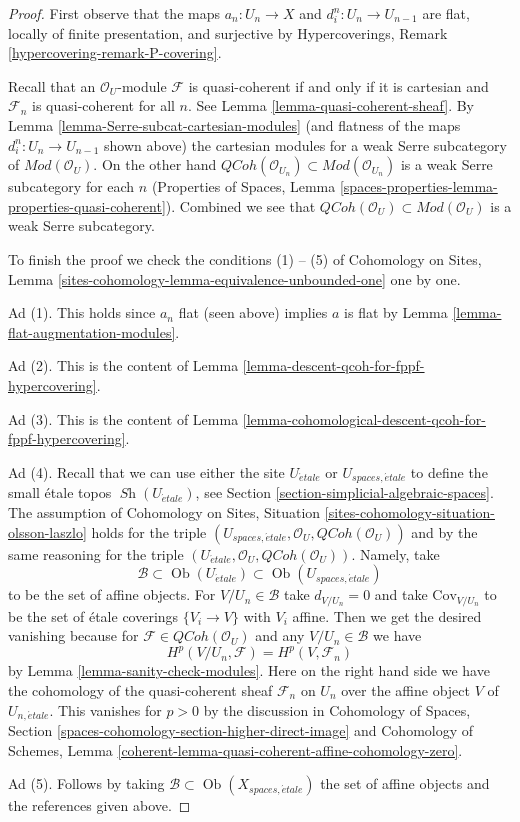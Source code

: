 \documentclass{stacks-project}
\theoremstyle{plain}
\theoremstyle{definition}
\theoremstyle{remark}
\numberwithin{equation}{subsection}
\def\Ob{\mathop{\mathrm{Ob}}\nolimits}
\def\Sh{\mathop{\mathit{Sh}}\nolimits}
\def\etale{{\acute{e}tale}}
\def\QCoh{\mathit{QCoh}}
\begin{document}
\begin{proof}
First observe that the maps $a_n : U_n \to X$ and $d^n_i : U_n \to U_{n - 1}$
are flat, locally of finite presentation, and surjective by
Hypercoverings, Remark \ref{hypercovering-remark-P-covering}.

\medskip\noindent
Recall that an $\mathcal{O}_U$-module $\mathcal{F}$ is quasi-coherent if and
only if it is cartesian and $\mathcal{F}_n$ is quasi-coherent for all $n$.
See Lemma \ref{lemma-quasi-coherent-sheaf}.
By Lemma \ref{lemma-Serre-subcat-cartesian-modules}
(and flatness of the maps $d^n_i : U_n \to U_{n - 1}$ shown above)
the cartesian modules for a weak Serre subcategory of
$\textit{Mod}(\mathcal{O}_U)$. On the other hand
$\QCoh(\mathcal{O}_{U_n}) \subset \textit{Mod}(\mathcal{O}_{U_n})$
is a weak Serre subcategory for each $n$
(Properties of Spaces, Lemma
\ref{spaces-properties-lemma-properties-quasi-coherent}).
Combined we see that
$\QCoh(\mathcal{O}_U) \subset \textit{Mod}(\mathcal{O}_U)$
is a weak Serre subcategory.

\medskip\noindent
To finish the proof we check the conditions (1) -- (5) of
Cohomology on Sites, Lemma
\ref{sites-cohomology-lemma-equivalence-unbounded-one} one by one.

\medskip\noindent
Ad (1). This holds since $a_n$ flat (seen above) implies $a$ is flat
by Lemma \ref{lemma-flat-augmentation-modules}.

\medskip\noindent
Ad (2). This is the content of
Lemma \ref{lemma-descent-qcoh-for-fppf-hypercovering}.

\medskip\noindent
Ad (3). This is the content of
Lemma \ref{lemma-cohomological-descent-qcoh-for-fppf-hypercovering}.

\medskip\noindent
Ad (4). Recall that we can use either the site $U_\etale$ or
$U_{spaces, \etale}$ to define the small \'etale topos
$\Sh(U_\etale)$, see Section \ref{section-simplicial-algebraic-spaces}.
The assumption of
Cohomology on Sites, Situation \ref{sites-cohomology-situation-olsson-laszlo}
holds for the triple
$(U_{spaces, \etale}, \mathcal{O}_U, \QCoh(\mathcal{O}_U))$
and by the same reasoning for the triple
$(U_\etale, \mathcal{O}_U, \QCoh(\mathcal{O}_U))$.
Namely, take
$$
\mathcal{B} \subset \Ob(U_\etale) \subset \Ob(U_{spaces, \etale})
$$
to be the set of affine objects. For $V/U_n \in \mathcal{B}$
take $d_{V/U_n} = 0$ and take $\text{Cov}_{V/U_n}$ to be the set of
\'etale coverings $\{V_i \to V\}$ with $V_i$ affine.
Then we get the desired vanishing because for
$\mathcal{F} \in \QCoh(\mathcal{O}_U)$
and any $V/U_n \in \mathcal{B}$ we have
$$
H^p(V/U_n, \mathcal{F}) = H^p(V, \mathcal{F}_n)
$$
by Lemma \ref{lemma-sanity-check-modules}. Here on the
right hand side we have the cohomology of the quasi-coherent
sheaf $\mathcal{F}_n$ on $U_n$ over the affine object $V$
of $U_{n, \etale}$. This vanishes for $p > 0$ by the discussion in
Cohomology of Spaces, Section
\ref{spaces-cohomology-section-higher-direct-image} and
Cohomology of Schemes, Lemma
\ref{coherent-lemma-quasi-coherent-affine-cohomology-zero}.

\medskip\noindent
Ad (5). Follows by taking $\mathcal{B} \subset \Ob(X_{spaces, \etale})$
the set of affine objects and the references given above.
\end{proof}
\end{document}
